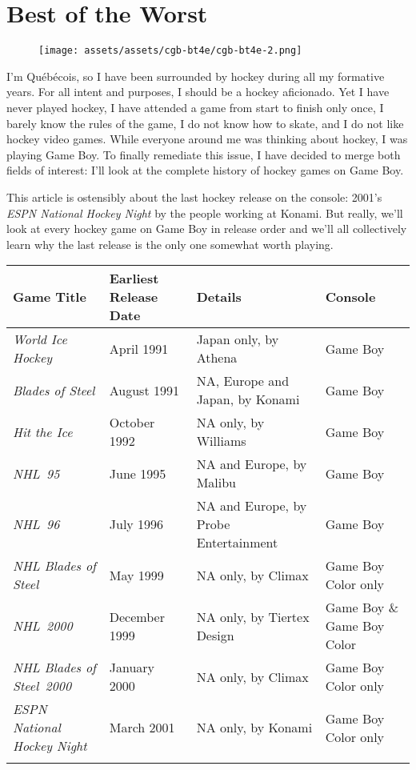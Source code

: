 \documentclass{book}
\let\oldcenter\center
\let\oldendcenter\endcenter
\renewenvironment{center}{\setlength\topsep{0pt}\oldcenter}{\oldendcenter}
\begin{document}
\newpage\FloatBarrier\needspace{10mm}\section*{Best of the Worst}\nopagebreak[4]
\begin{wrapfigure}{L}{0pt} \texttt{[image: assets/assets/cgb-bt4e/cgb-bt4e-2.png]}\end{wrapfigure}
I’m Québécois, so I have been surrounded by hockey during all my formative years. For all intent and purposes, I should be a hockey aficionado. Yet I have never played hockey, I have attended a game from start to finish only once, I barely know the rules of the game, I do not know how to skate, and I do not like hockey video games. While everyone around me was thinking about hockey, I was playing Game Boy. To finally remediate this issue, I have decided to merge both fields of interest: I’ll look at the complete history of hockey games on Game Boy.

This article is ostensibly about the last hockey release on the console: 2001’s \emph{ESPN National Hockey Night} by the people working at Konami. But really, we’ll look at every hockey game on Game Boy in release order and we’ll all collectively learn why the last release is the only one somewhat worth playing.

\begin{center} \footnotesize\begin{tabulary}{\textwidth}{LLLL} \hline
\textbf{Game Title} & \textbf{Earliest Release Date} & \textbf{Details} & \textbf{Console} \\
\hline
\emph{World Ice Hockey} & April 1991 & Japan only, by Athena & Game Boy \\
\hline
\emph{Blades of Steel} & August 1991 & NA, Europe and Japan, by Konami & Game Boy \\
\hline
\emph{Hit the Ice} & October 1992 & NA only, by Williams & Game Boy \\
\hline
\emph{NHL 95} & June 1995 & NA and Europe, by Malibu & Game Boy \\
\hline
\emph{NHL 96} & July 1996 & NA and Europe, by Probe Entertainment & Game Boy \\
\hline
\emph{NHL Blades of Steel} & May 1999 & NA only, by Climax & Game Boy Color only \\
\hline
\emph{NHL 2000} & December 1999 & NA only, by Tiertex Design & Game Boy \& Game Boy Color \\
\hline
\emph{NHL Blades of Steel 2000} & January 2000 & NA only, by Climax & Game Boy Color only \\
\hline
\emph{ESPN National Hockey Night} & March 2001 & NA only, by Konami & Game Boy Color only \\
\hline \normalsize\end{tabulary} \end{center}
\end{document}
